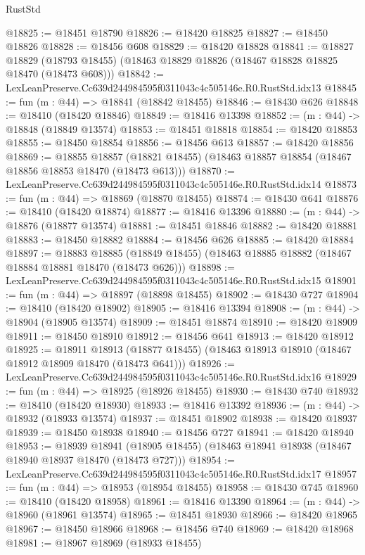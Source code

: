 \begin{lexlean}{RustStd}
\begin{coremodule}
@18825 := @18451 @18790
@18826 := @18420 @18825
@18827 := @18450 @18826
@18828 := @18456 @608
@18829 := @18420 @18828
@18841 := @18827
    @18829
    (@18793 @18455)
    (@18463 @18829 @18826 (@18467 @18828 @18825 @18470 (@18473 @608)))
@18842 := LexLeanPreserve.Cc639d244984595f0311043c4c505146e.R0.RustStd.idx13
@18845 := fun (m : @44) => @18841 (@18842 @18455)
@18846 := @18430 @626
@18848 := @18410 (@18420 @18846)
@18849 := @18416 @13398
@18852 := (m : @44) -> @18848 (@18849 @13574)
@18853 := @18451 @18818
@18854 := @18420 @18853
@18855 := @18450 @18854
@18856 := @18456 @613
@18857 := @18420 @18856
@18869 := @18855
    @18857
    (@18821 @18455)
    (@18463 @18857 @18854 (@18467 @18856 @18853 @18470 (@18473 @613)))
@18870 := LexLeanPreserve.Cc639d244984595f0311043c4c505146e.R0.RustStd.idx14
@18873 := fun (m : @44) => @18869 (@18870 @18455)
@18874 := @18430 @641
@18876 := @18410 (@18420 @18874)
@18877 := @18416 @13396
@18880 := (m : @44) -> @18876 (@18877 @13574)
@18881 := @18451 @18846
@18882 := @18420 @18881
@18883 := @18450 @18882
@18884 := @18456 @626
@18885 := @18420 @18884
@18897 := @18883
    @18885
    (@18849 @18455)
    (@18463 @18885 @18882 (@18467 @18884 @18881 @18470 (@18473 @626)))
@18898 := LexLeanPreserve.Cc639d244984595f0311043c4c505146e.R0.RustStd.idx15
@18901 := fun (m : @44) => @18897 (@18898 @18455)
@18902 := @18430 @727
@18904 := @18410 (@18420 @18902)
@18905 := @18416 @13394
@18908 := (m : @44) -> @18904 (@18905 @13574)
@18909 := @18451 @18874
@18910 := @18420 @18909
@18911 := @18450 @18910
@18912 := @18456 @641
@18913 := @18420 @18912
@18925 := @18911
    @18913
    (@18877 @18455)
    (@18463 @18913 @18910 (@18467 @18912 @18909 @18470 (@18473 @641)))
@18926 := LexLeanPreserve.Cc639d244984595f0311043c4c505146e.R0.RustStd.idx16
@18929 := fun (m : @44) => @18925 (@18926 @18455)
@18930 := @18430 @740
@18932 := @18410 (@18420 @18930)
@18933 := @18416 @13392
@18936 := (m : @44) -> @18932 (@18933 @13574)
@18937 := @18451 @18902
@18938 := @18420 @18937
@18939 := @18450 @18938
@18940 := @18456 @727
@18941 := @18420 @18940
@18953 := @18939
    @18941
    (@18905 @18455)
    (@18463 @18941 @18938 (@18467 @18940 @18937 @18470 (@18473 @727)))
@18954 := LexLeanPreserve.Cc639d244984595f0311043c4c505146e.R0.RustStd.idx17
@18957 := fun (m : @44) => @18953 (@18954 @18455)
@18958 := @18430 @745
@18960 := @18410 (@18420 @18958)
@18961 := @18416 @13390
@18964 := (m : @44) -> @18960 (@18961 @13574)
@18965 := @18451 @18930
@18966 := @18420 @18965
@18967 := @18450 @18966
@18968 := @18456 @740
@18969 := @18420 @18968
@18981 := @18967
    @18969
    (@18933 @18455)

\end{coremodule}
\end{lexlean}

